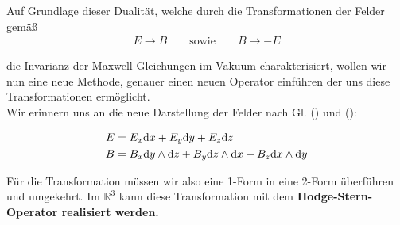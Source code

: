 Auf Grundlage dieser Dualität, welche durch die Transformationen der Felder gemäß
\begin{align*}
E \rightarrow B \qquad \text{sowie} \qquad B \rightarrow -E
\end{align*}

die Invarianz der Maxwell-Gleichungen im Vakuum charakterisiert, wollen wir nun eine neue Methode, genauer einen neuen Operator einführen der uns diese Transformationen ermöglicht. \\
Wir erinnern uns an die neue Darstellung der Felder nach Gl. () und ():

\begin{align*}
E &= E_x \dd x +E_y \dd y + E_z \dd z   \\
B &= B_x \dd y \wedge \dd z + B_y \dd z \wedge \dd x + B_z \dd x \wedge \dd y 
\end{align*}

Für die Transformation müssen wir also eine 1-Form in eine 2-Form überführen und umgekehrt. Im $\mathbb{R}^3$ kann diese Transformation mit dem \bfseries Hodge-Stern-Operator \normalfont realisiert werden.